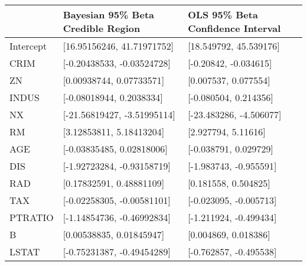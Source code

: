 \begin{tabular}{lll}
\hline
           & Bayesian 95\% Beta Credible Region   & OLS 95\% Beta Confidence Interval   \\
\hline
 Intercept & [16.95156246, 41.71971752]          & [18.549792, 45.539176]             \\
 CRIM      & [-0.20438533, -0.03524728]          & [-0.20842, -0.034615]              \\
 ZN        & [0.00938744, 0.07733571]            & [0.007537, 0.077554]               \\
 INDUS     & [-0.08018944, 0.2038334]            & [-0.080504, 0.214356]              \\
 NX        & [-21.56819427, -3.51995114]         & [-23.483286, -4.506077]            \\
 RM        & [3.12853811, 5.18413204]            & [2.927794, 5.11616]                \\
 AGE       & [-0.03835485, 0.02818006]           & [-0.038791, 0.029729]              \\
 DIS       & [-1.92723284, -0.93158719]          & [-1.983743, -0.955591]             \\
 RAD       & [0.17832591, 0.48881109]            & [0.181558, 0.504825]               \\
 TAX       & [-0.02258305, -0.00581101]          & [-0.023095, -0.005713]             \\
 PTRATIO   & [-1.14854736, -0.46992834]          & [-1.211924, -0.499434]             \\
 B         & [0.00538835, 0.01845947]            & [0.004869, 0.018386]               \\
 LSTAT     & [-0.75231387, -0.49454289]          & [-0.762857, -0.495538]             \\
\hline
\end{tabular}